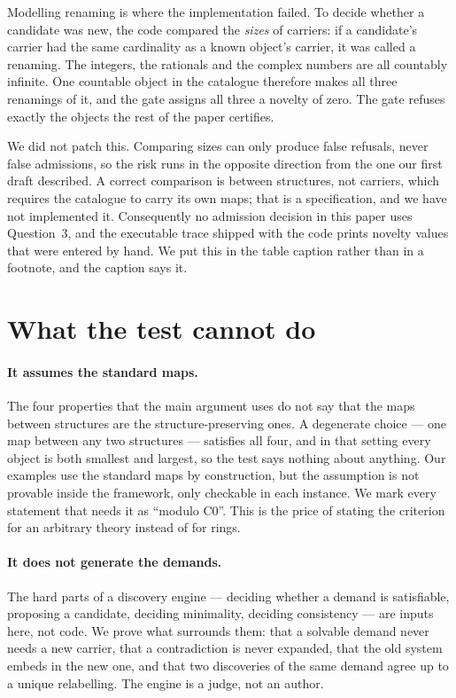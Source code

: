 \documentclass[aps,prd,preprint,superscriptaddress,amsmath,amssymb]{revtex4-2}
\begin{document}
Modelling renaming is where the implementation failed.  To decide whether a
candidate was new, the code compared the \emph{sizes} of carriers: if a candidate's
carrier had the same cardinality as a known object's carrier, it was called a
renaming.  The integers, the rationals and the complex numbers are all countably
infinite.  One countable object in the catalogue therefore makes all three
renamings of it, and the gate assigns all three a novelty of zero.  The gate
refuses exactly the objects the rest of the paper certifies.

We did not patch this.  Comparing sizes can only produce false refusals, never
false admissions, so the risk runs in the opposite direction from the one our first
draft described.  A correct comparison is between structures, not carriers, which
requires the catalogue to carry its own maps; that is a specification, and we have
not implemented it.  Consequently no admission decision in this paper uses
Question~3, and the executable trace shipped with the code prints novelty values
that were entered by hand.  We put this in the table caption rather than in a
footnote, and the caption says it.

\section{What the test cannot do}
\label{sec:limits}

\paragraph{It assumes the standard maps.}
The four properties that the main argument uses do not say that the maps between
structures are the structure-preserving ones.  A degenerate choice --- one map
between any two structures --- satisfies all four, and in that setting every object
is both smallest and largest, so the test says nothing about anything.  Our
examples use the standard maps by construction, but the assumption is not provable
inside the framework, only checkable in each instance.  We mark every statement that
needs it as ``modulo C0''.  This is the price of stating the criterion for an
arbitrary theory instead of for rings.

\paragraph{It does not generate the demands.}
The hard parts of a discovery engine --- deciding whether a demand is satisfiable,
proposing a candidate, deciding minimality, deciding consistency --- are inputs
here, not code.  We prove what surrounds them: that a solvable demand never needs
a new carrier, that a contradiction is never expanded, that the old system embeds
in the new one, and that two discoveries of the same demand agree up to a unique
relabelling.  The engine is a judge, not an author.
\end{document}
